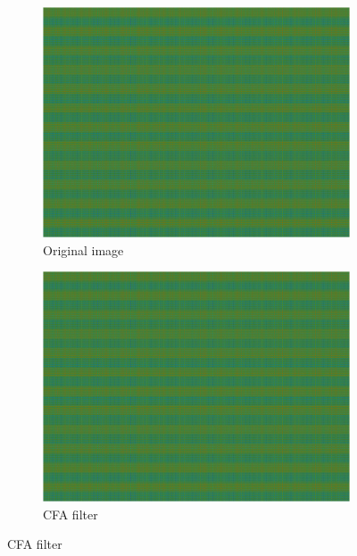 \documentclass{template/acm_proc_article-sp}
\begin{document}
\begin{figure}
    \begin{subfigure}{0.23\textwidth}
        \centering
        \includegraphics[trim=0 0 0 0,clip,width=\linewidth]{report/results/f1_steps_1.jpg}
        \caption{Original image}
    \end{subfigure}
    \hspace*{\fill}
    \begin{subfigure}{0.23\textwidth}
        \centering
        \includegraphics[trim=0 0 0 0,clip,width=\linewidth]{report/results/f1_steps_1.jpg}
        \caption{CFA filter}
    \end{subfigure}
    

\end{figure}
\end{document}
